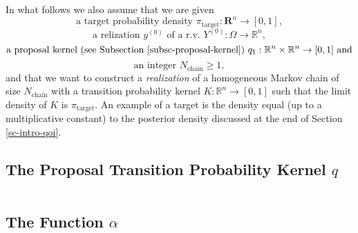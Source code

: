 In what follows we also assume that
we are given
\begin{equation}\label{eq-pi-target}
\mbox{a target probability density }\pi_{\mbox{target}}:\mathbf{R}^n\rightarrow [0,1],
\end{equation}
\begin{equation}\label{eq-y0}
\mbox{a relization }y^{(0)}\mbox{ of a r.v. }Y^{(0)}:\Omega\rightarrow\mathbb{R}^n,
\end{equation}
\begin{equation}\label{eq-q1}
\mbox{a proposal kernel (see Subsection \ref{subsc-proposal-kernel}) }q_1:\mathbb{R}^n\times \mathbb{R}^n\rightarrow [0,1]\mbox{ and}
\end{equation}
\begin{equation}\label{eq-n-chain}
\mbox{an integer }N_{\mbox{chain}}\geqslant 1,
\end{equation}
and that
we want to construct a {\it realization} of
a homogeneous Markov chain of size $N_{\mbox{chain}}$ with a transition probability kernel $K:\mathbb{R}^n\rightarrow [0,1]$
such that the limit density of $K$ is $\pi_{\mbox{target}}$.
An example of a target is the density equal (up to a multiplicative constant) to the posterior density discussed
at the end of Section \ref{sc-intro-qoi}.

\subsection{The Proposal Transition Probability Kernel $q$}\label{subsc-proposal-kernel}
$~$\\

\subsection{The Function $\alpha$}


